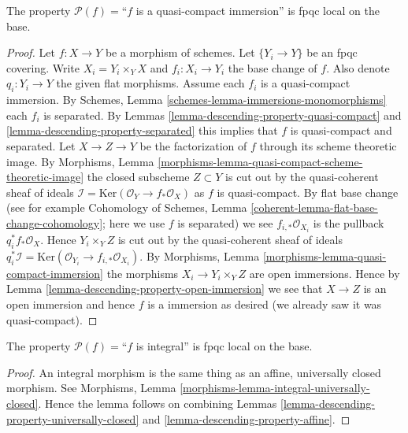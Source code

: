 \begin{lemma}
\label{lemma-descending-property-quasi-compact-immersion}
The property $\mathcal{P}(f) =$``$f$ is a quasi-compact immersion''
is fpqc local on the base.
\end{lemma}

\begin{proof}
Let $f : X \to Y$ be a morphism of schemes.
Let $\{Y_i \to Y\}$ be an fpqc covering.
Write $X_i = Y_i \times_Y X$ and $f_i : X_i \to Y_i$
the base change of $f$. Also denote
$q_i : Y_i \to Y$ the given flat morphisms.
Assume each $f_i$ is a quasi-compact immersion.
By Schemes, Lemma \ref{schemes-lemma-immersions-monomorphisms}
each $f_i$ is separated.
By Lemmas \ref{lemma-descending-property-quasi-compact} and
\ref{lemma-descending-property-separated}
this implies that $f$ is quasi-compact and separated.
Let $X \to Z \to Y$ be the factorization of $f$ through its
scheme theoretic image. By
Morphisms, Lemma \ref{morphisms-lemma-quasi-compact-scheme-theoretic-image}
the closed subscheme $Z \subset Y$ is cut out by the
quasi-coherent sheaf of ideals
$\mathcal{I} = \text{Ker}(\mathcal{O}_Y \to f_*\mathcal{O}_X)$
as $f$ is quasi-compact. By flat base change
(see for example
Cohomology of Schemes, Lemma \ref{coherent-lemma-flat-base-change-cohomology};
here we use $f$ is separated)
we see $f_{i, *}\mathcal{O}_{X_i}$ is the pullback $q_i^*f_*\mathcal{O}_X$.
Hence $Y_i \times_Y Z$ is cut out by the
quasi-coherent sheaf of ideals $q_i^*\mathcal{I} =
\text{Ker}(\mathcal{O}_{Y_i} \to f_{i, *}\mathcal{O}_{X_i})$.
By Morphisms, Lemma \ref{morphisms-lemma-quasi-compact-immersion}
the morphisms $X_i \to Y_i \times_Y Z$
are open immersions. Hence by
Lemma \ref{lemma-descending-property-open-immersion}
we see that $X \to Z$ is an open immersion and
hence $f$ is a immersion as desired
(we already saw it was quasi-compact).
\end{proof}

\begin{lemma}
\label{lemma-descending-property-integral}
The property $\mathcal{P}(f) =$``$f$ is integral''
is fpqc local on the base.
\end{lemma}

\begin{proof}
An integral morphism is the same thing as an affine,
universally closed morphism. See
Morphisms, Lemma \ref{morphisms-lemma-integral-universally-closed}.
Hence the lemma follows on combining
Lemmas \ref{lemma-descending-property-universally-closed}
and \ref{lemma-descending-property-affine}.
\end{proof}

